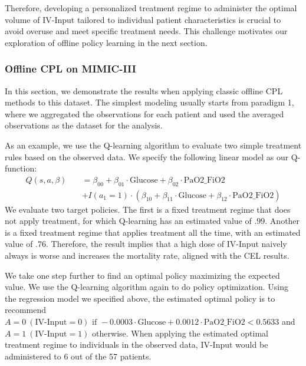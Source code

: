 Therefore, developing a personalized treatment regime to administer the optimal volume of IV-Input tailored to individual patient characteristics is crucial to avoid overuse and meet specific treatment needs. This challenge motivates our exploration of offline policy learning in the next section.



\subsubsection{Offline \acrshort{CPL} on \acrshort{MIMIC-III}}
In this section, we demonstrate the results when applying classic offline \acrshort{CPL} methods to this dataset. 
The simplest modeling usually starts from paradigm 1, where we aggregated the observations for each patient and used the averaged observations as the dataset for the analysis.

As an example, we use the Q-learning algorithm to evaluate two simple treatment rules based on the observed data. 
We specify the following linear model as our Q-function: 
$$
\begin{aligned}
Q(s, a, \beta) &= \beta_{00} + \beta_{01} \cdot \text{Glucose} + \beta_{02} \cdot \text{PaO2\_FiO2} \\ \qquad\qquad\qquad
&+ I(a_1 = 1) \cdot \left(\beta_{10} + \beta_{11} \cdot \text{Glucose} + \beta_{12} \cdot \text{PaO2\_FiO2}\right)
\end{aligned}
$$
We evaluate two target policies. The first is a fixed treatment regime that does not apply treatment, for which Q-learning has an estimated value of $.99$. Another is a fixed treatment regime that applies treatment all the time, with an estimated value of $.76$. Therefore, the result implies that a high dose of IV-Input naively always is worse and increases the mortality rate, aligned with the \acrshort{CEL} results. 

We take one step further to find an optimal policy maximizing the expected value. We use the Q-learning algorithm again to do policy optimization. 
Using the regression model we specified above, the estimated optimal policy is to recommend $A = 0 \ (\text{IV-Input} = 0) \text{ if } -0.0003 \cdot \text{Glucose} + 0.0012 \cdot \text{PaO2\_FiO2} < 0.5633$ and $A = 1 \ (\text{IV-Input} = 1)$ otherwise. 
When applying the estimated optimal treatment regime to individuals in the observed data, IV-Input would be administered to 6 out of the 57 patients.


